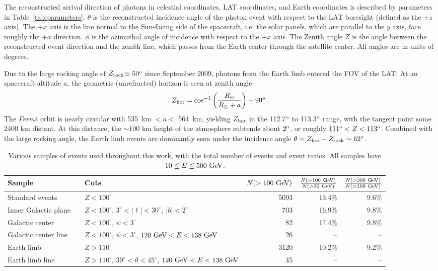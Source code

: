\documentclass[aps,twocolumn,prd,superscriptaddress,showpacs,nofootinbib,fixfloat]{revtex4}
\newcommand{\be}{\begin{equation}}
\newcommand{\ee}{\end{equation}}
\newcommand{\Fermi}{{\slshape Fermi}}
\newcommand{\GeV}{{\rm ~GeV}}
\newcommand{\degree}{^{\rm o}}
\newcommand{\zrock}{$Z_{\rm rock}$}
\begin{document}
The reconstructed arrival direction of photons in celestial coordinates, LAT
coordinates, and Earth coordinates is described by parameters in 
Table~\ref{tab:parameters}.  $\theta$ is the reconstructed incidence angle of
the photon event with respect to the LAT boresight (defined as the $+z$ axis).
The $+x$ axis is the line normal to the Sun-facing side of the spacecraft,
i.e. the solar panels, which are parallel to the $y$ axis, face roughly the $+x$ direction.   $\phi$ is the
azimuthal angle of incidence with respect to the $+x$ axis.
The Zenith angle $Z$ is the angle between the
reconstructed event direction and the zenith line, which passes from the
Earth center through the satellite center.  All angles are in units of
degrees.

Due to the large rocking angle of \zrock$\simeq50\degree$
since September 2009, photons from the Earth limb 
entered the FOV of the LAT:
%
At an spacecraft altitude $a$, the geometric (unrefracted) horizon is seen at zenith angle \be
Z_{\rm hor} = \cos^{-1}\left(\frac{R_\oplus}{R_\oplus+a}\right)+90\degree\;. \ee
The \Fermi\ orbit is nearly circular with 535~km $< a <$ 564~km, yielding
$Z_{\rm hor}$ in the 112.7$\degree$ to 113.3$\degree$ range, with the tangent
point some 2400 km distant.  At this distance, the $\sim 100$ km height of the
atmosphere subtends about $2\degree$, or roughly $111\degree < Z <
113\degree$. Combined with the large rocking angle, the Earth limb events are
dominantly seen under the incidence angle $\theta=Z_{\rm hor}-Z_{\rm rock}\sim 62^\circ$.
\medskip

\begin{table}
  \begin{tabular}{lllrrr}
    \hline
    Sample &&Cuts & $N(>100\GeV)$ & $\frac{N(>100\GeV)}{N(>30\GeV)}$ & $\frac{N(>300\GeV)}{N(>100\GeV)}$\\
    \hline
    Standard events      &  & $Z<100^\circ$ & 5093 & 13.4\% & 9.6\% \\
    Inner Galactic plane &  & $Z<100^\circ$, $3^\circ < |\ell| < 30^\circ,\ |b|<2^\circ$     & 703 & 16.9\% & 9.8\% \\
    Galactic center      &  & $Z<100^\circ$, $\psi<3^\circ$ & 82 & 17.4\% & 9.8\% \\
    Galactic center line &  & $Z<100^\circ$, $\psi<3^\circ$, $120\GeV<E<138\GeV$             & 26 & -- & -- \\
    Earth limb           &  & $Z>110^\circ$ & 3120 & 10.2\% & 9.2\% \\
    Earth limb line      &  & $Z>110^\circ$, $30^\circ<\theta<45^\circ$, $120\GeV<E<138\GeV$ & 45 & -- & -- \\ 
    \hline
  \end{tabular}
  \caption{Various samples of events used throughout this work, with 
    the total number of events and event ratios.
    All samples have $10\leq E\leq500\GeV$.}
  \label{tab:regions}
\end{table}
\end{document}
